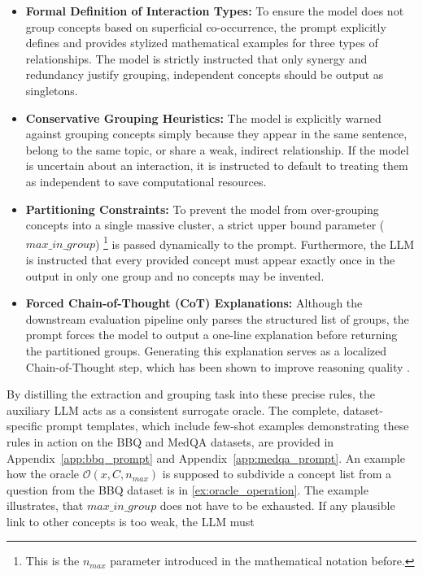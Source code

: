 \begin{itemize}
    \item \textbf{Formal Definition of Interaction Types:} To ensure the model does not group concepts based on superficial co-occurrence, the prompt explicitly defines and provides stylized mathematical examples for three types of relationships. The model is strictly instructed that only synergy and redundancy justify grouping, independent concepts should be output as singletons.
    
    \item \textbf{Conservative Grouping Heuristics:} The model is explicitly warned against grouping concepts simply because they appear in the same sentence, belong to the same topic, or share a weak, indirect relationship. If the model is uncertain about an interaction, it is instructed to default to treating them as independent to save computational resources.
    
    \item \textbf{Partitioning Constraints:} To prevent the model from over-grouping concepts into a single massive cluster, a strict upper bound parameter ($max\_in\_group$) \footnote{This is the $n_{max}$ parameter introduced in the mathematical notation before.} is passed dynamically to the prompt. Furthermore, the LLM is instructed that every provided concept must appear exactly once in the output in only one group and no concepts may be invented.
    
    \item \textbf{Forced Chain-of-Thought (CoT) Explanations:} Although the downstream evaluation pipeline only parses the structured list of groups, the prompt forces the model to output a one-line explanation before returning the partitioned groups. Generating this explanation serves as a localized Chain-of-Thought step, which has been shown to improve reasoning quality \cite{weiChainofthoughtPromptingElicits2022}.
\end{itemize}

By distilling the extraction and grouping task into these precise rules, the auxiliary LLM acts as a consistent surrogate oracle. The complete, dataset-specific prompt templates, which include few-shot examples demonstrating these rules in action on the BBQ and MedQA datasets, are provided in Appendix~\ref{app:bbq_prompt} and Appendix~\ref{app:medqa_prompt}.
An example how the oracle $\mathcal{O}(x, C, n_{max})$ is supposed to subdivide a concept list from a question from the BBQ dataset is in \ref{ex:oracle_operation}. The example illustrates, that $max\_in\_group$ does not have to be exhausted. If any plausible link to other concepts is too weak, the LLM must

